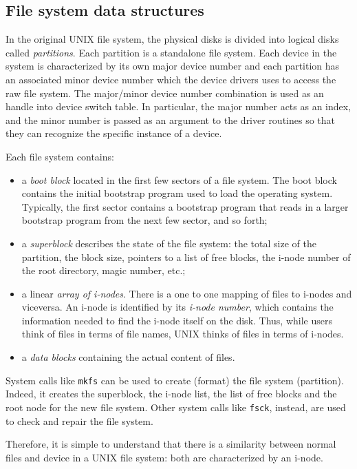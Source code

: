 \subsection{File system data structures}
In the original UNIX file system, the physical disks is divided into logical disks called \emph{partitions}. Each partition is a standalone file system. Each device in the system is characterized by its own major device number and each partition has an associated minor device number which the device drivers uses to access the raw file system. The major/minor device number combination is used as an handle into device switch table. In particular, the major number acts as an index, and the minor number is passed as an argument to the driver routines so that they can recognize the specific instance of a device.


Each file system contains:
\begin{itemize}
\item a \emph{boot block} located in the first few sectors of a file system. The boot block contains the initial bootstrap program used to load the operating system. Typically, the first sector contains a bootstrap program that reads in a larger bootstrap program from the next few sector, and so forth;
\item a \emph{superblock} describes the state of the file system: the total size of the partition, the block size, pointers to a list of free blocks, the i-node number of the root directory, magic number, etc.;
\item a linear \emph{array of i-nodes}. There is a one to one mapping of files to i-nodes and viceversa. An i-node is identified by its \emph{i-node number}, which  contains the information needed to find the i-node itself on the disk. Thus, while users think of files in terms of file names, UNIX thinks of files in terms of i-nodes.
\item a \emph{data blocks} containing the actual content of files.
\end{itemize}

System calls like \texttt{mkfs} can be used to create (format) the file system (partition). Indeed, it creates the superblock, the i-node list, the list of free blocks and the root node for the new file system. Other system calls like \texttt{fsck}, instead, are used to check and repair the file system.

Therefore, it is simple to understand that there is a similarity between normal files and device in a UNIX file system: both are characterized by an i-node.

